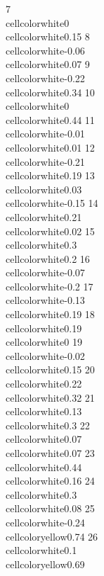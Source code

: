\documentclass{article}\usepackage[]{graphicx}\usepackage[]{color}
\begin{document}
7      \\cellcolor{white}{0}  \\cellcolor{white}{0.15}
8  \\cellcolor{white}{-0.06}  \\cellcolor{white}{0.07}
9  \\cellcolor{white}{-0.22}  \\cellcolor{white}{0.34}
10     \\cellcolor{white}{0}  \\cellcolor{white}{0.44}
11 \\cellcolor{white}{-0.01}  \\cellcolor{white}{0.01}
12 \\cellcolor{white}{-0.21}  \\cellcolor{white}{0.19}
13  \\cellcolor{white}{0.03} \\cellcolor{white}{-0.15}
14  \\cellcolor{white}{0.21}  \\cellcolor{white}{0.02}
15   \\cellcolor{white}{0.3}   \\cellcolor{white}{0.2}
16 \\cellcolor{white}{-0.07}  \\cellcolor{white}{-0.2}
17 \\cellcolor{white}{-0.13}  \\cellcolor{white}{0.19}
18  \\cellcolor{white}{0.19}     \\cellcolor{white}{0}
19 \\cellcolor{white}{-0.02}  \\cellcolor{white}{0.15}
20  \\cellcolor{white}{0.22}  \\cellcolor{white}{0.32}
21  \\cellcolor{white}{0.13}   \\cellcolor{white}{0.3}
22  \\cellcolor{white}{0.07}  \\cellcolor{white}{0.07}
23  \\cellcolor{white}{0.44}  \\cellcolor{white}{0.16}
24   \\cellcolor{white}{0.3}  \\cellcolor{white}{0.08}
25 \\cellcolor{white}{-0.24} \\cellcolor{yellow}{0.74}
26   \\cellcolor{white}{0.1} \\cellcolor{yellow}{0.69}
\end{document}
